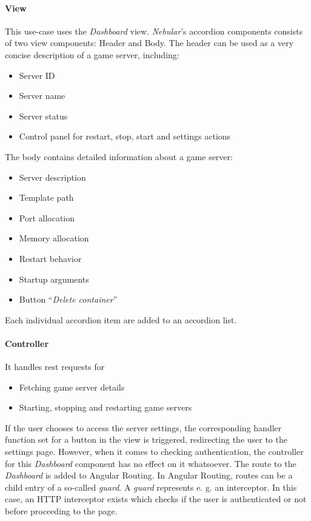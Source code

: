 \documentclass[a4paper,12pt,chapterprefix=false,bibliography=totoc,listof=totoc,]{scrreprt}
\begin{document}
\paragraph{View}
This use-case uses the \textit{Dashboard} view. \textit{Nebular}'s accordion components consists of two view components: Header and Body. The header can be used as a very concise description of a game server, including:
\begin{itemize}
	\item Server ID
	\item Server name
	\item Server status
	\item Control panel for restart, stop, start and settings actions
\end{itemize}
The body contains detailed information about a game server:
\begin{itemize}
	\item Server description
	\item Template path
	\item Port allocation
	\item Memory allocation
	\item Restart behavior
	\item Startup arguments
	\item Button \enquote{\textit{Delete container}}
\end{itemize}
Each individual accordion item are added to an accordion list.

\paragraph{Controller}
It handles \gls{rest} requests for
\begin{itemize}
	\item Fetching game server details
	\item Starting, stopping and restarting game servers
\end{itemize}
If the user chooses to access the server settings, the corresponding handler function set for a button in the view is triggered, redirecting the user to the settings page.
However, when it comes to checking authentication, the controller for this \textit{Dashboard} component has no effect on it whatsoever. The route to the \textit{Dashboard} is added to Angular Routing. In Angular Routing, routes can be a child entry of a so-called \textit{guard}. A \textit{guard} represents e. g. an interceptor. In this case, an HTTP interceptor exists which checks if the user is authenticated or not before proceeding to the page.
\end{document}
